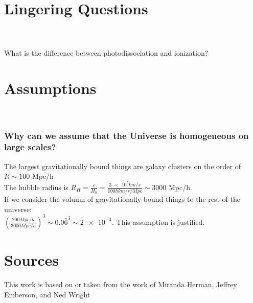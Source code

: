 \documentclass{article}
\begin{document}
\section{Lingering Questions }\\
\\
What is the difference between photodissociation and ionization? \\ 
\section{Assumptions }\\
\subsubsection{Why can we assume that the Universe is homogeneous on large scales?}
The largest gravitationally bound things are galaxy clusters on the order of $R\sim100$ Mpc/h\\
The hubble radius is $R_H=\frac{c}{H_0}=\frac{\num{3e5}km/s}{100 h km/s/Mpc}\sim 3000$ Mpc/h. \\
If we consider the volumn of gravitationally bound things to the rest of the universe: \\
$(\frac{200 Mpc/h}{3000 Mpc/h})^3\sim0.0\bar{6}^3\sim\num{2e-4}$. This assumption is justified.
\section{Sources}
This work is based on or taken from the work of Miranda Herman, Jeffrey Emberson, and Ned Wright
\end{document}
